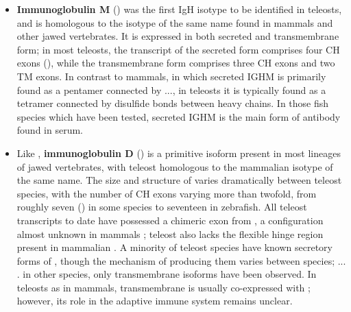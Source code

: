 \begin{itemize}
\item \textbf{Immunoglobulin M} () was the first IgH isotype to be identified in teleosts, and is homologous to the isotype of the same name found in mammals and other jawed vertebrates. It is expressed in both secreted and transmembrane form; in most teleosts, the transcript of the secreted form comprises four CH exons (), while the transmembrane form comprises three CH exons and two TM exons. In contrast to mammals, in which secreted IGHM is primarily found as a pentamer connected by ..., in teleosts it is typically found as a tetramer connected by disulfide bonds between heavy chains. In those fish species which have been tested, secreted IGHM is the main form of antibody found in serum.
\item Like , \textbf{immunoglobulin D} () is a primitive isoform present in most lineages of jawed vertebrates, with teleost  homologous to the mammalian isotype of the same name. The size and structure of  varies dramatically between teleost species, with the number of CH exons varying more than twofold, from roughly seven () in some species to seventeen in zebrafish.
All teleost  transcripts to date have possessed a chimeric  exon from , a configuration almost unknown in mammals \citep{fillatreau2013astonishing}; teleost  also lacks the flexible hinge region present in mammalian  \citep{fillatreau2013astonishing}. A minority of teleost species have known secretory forms of , though the mechanism of producing them varies between species; ... . %
in other species, only transmembrane isoforms have been observed. In teleosts as in mammals, transmembrane  is usually co-expressed with ; however, its role in the adaptive immune system remains unclear.

\end{itemize}
